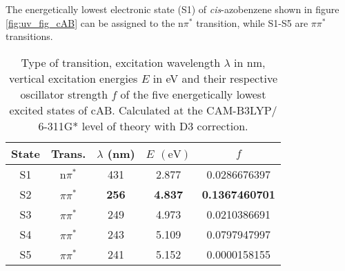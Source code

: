The energetically lowest electronic state (S1) of \textit{cis}-azobenzene shown in figure \ref{fig:uv_fig_cAB} can be assigned to the n$\pi^*$ transition, while S1-S5 are $\pi\pi^*$ transitions. 
%
%
\begin{table}[H]
\caption{Type of transition, excitation wavelength $\lambda$ in nm, vertical excitation energies $E$ in eV and their respective oscillator strength $f$ of the five energetically lowest excited states of cAB. Calculated at the CAM-B3LYP/\\6-311G* level of theory with D3 correction.}
\label{tab:excited_states_cAB}
\vspace{0.1 cm}
\centering
\begin{tabular}{ccccc}
\toprule
State & Trans. & $\lambda$ (nm) & $E$ $\left(\si{\eV}\right)$ & $f$    \\
\midrule
S1    & n$\pi^*$		& 431			& 2.877				& 0.0286676397          \\
S2    & $\pi\pi^*$ 		& \textbf{256}	& \textbf{4.837}	& \textbf{0.1367460701} \\
S3    & $\pi\pi^*$ 		& 249			& 4.973             & 0.0210386691          \\
S4    & $\pi\pi^*$		& 243			& 5.109             & 0.0797947997          \\
S5    & $\pi\pi^*$		& 241			& 5.152             & 0.0000158155         \\
\bottomrule
\end{tabular}
\end{table}
%
%
